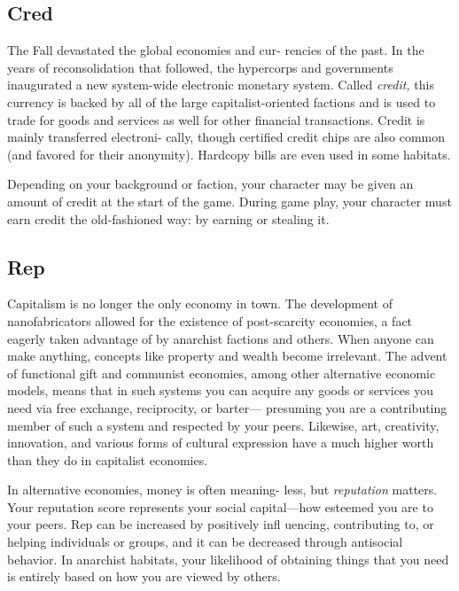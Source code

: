 \subsection{Cred}

The Fall devastated the global economies and cur-
rencies of the past. In the years of reconsolidation 
that followed, the hypercorps and governments 
inaugurated a new system-wide electronic monetary 
system. Called \textit{credit,} this currency is backed by all 
of the large capitalist-oriented factions and is used to 
trade for goods and services as well for other financial 
transactions. Credit is mainly transferred electroni-
cally, though certified credit chips are also common 
(and favored for their anonymity). Hardcopy bills are 
even used in some habitats.

Depending on your background or faction, your 
character may be given an amount of credit at the 
start of the game. During game play, your character 
must earn credit the old-fashioned way: by earning 
or stealing it.

\subsection{Rep}

Capitalism is no longer the only economy in town. 
The development of nanofabricators allowed for the 
existence of post-scarcity economies, a fact eagerly 
taken advantage of by anarchist factions and others. 
When anyone can make anything, concepts like 
property and wealth become irrelevant. The advent 
of functional gift and communist economies, among 
other alternative economic models, means that in 
such systems you can acquire any goods or services 
you need via free exchange, reciprocity, or barter—
presuming you are a contributing member of such 
a system and respected by your peers. Likewise, art, 
creativity, innovation, and various forms of cultural 
expression have a much higher worth than they do in 
capitalist economies.

In alternative economies, money is often meaning-
less, but \textit{reputation} matters. Your reputation score 
represents your social capital—how esteemed you 
are to your peers. Rep can be increased by positively 
infl uencing, contributing to, or helping individuals or 
groups, and it can be decreased through antisocial 
behavior. In anarchist habitats, your likelihood of 
obtaining things that you need is entirely based on 
how you are viewed by others.

